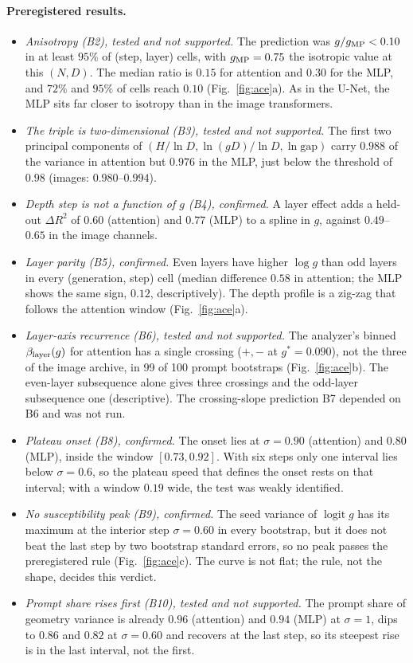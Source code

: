 \documentclass[11pt]{article}
\newcommand{\gap}{\mathrm{gap}}
\begin{document}
\paragraph{Preregistered results.}
\begin{itemize}
 \item \emph{Anisotropy (B2), tested and not supported.} The prediction was $g/g_{\rm MP}<0.10$ in at least $95\%$ of (step, layer) cells, with $g_{\rm MP}=0.75$ the isotropic value at this $(N,D)$. The median ratio is $0.15$ for attention and $0.30$ for the MLP, and $72\%$ and $95\%$ of cells reach $0.10$ (Fig.~\ref{fig:ace}a). As in the U-Net, the MLP sits far closer to isotropy than in the image transformers.
 \item \emph{The triple is two-dimensional (B3), tested and not supported.} The first two principal components of $(H/\ln D, \ln(gD)/\ln D, \ln\gap)$ carry $0.988$ of the variance in attention but $0.976$ in the MLP, just below the threshold of $0.98$ (images: $0.980$--$0.994$).
 \item \emph{Depth step is not a function of $g$ (B4), confirmed.} A layer effect adds a held-out $\Delta R^2$ of $0.60$ (attention) and $0.77$ (MLP) to a spline in $g$, against $0.49$--$0.65$ in the image channels.
 \item \emph{Layer parity (B5), confirmed.} Even layers have higher $\log g$ than odd layers in every (generation, step) cell (median difference $0.58$ in attention; the MLP shows the same sign, $0.12$, descriptively). The depth profile is a zig-zag that follows the attention window (Fig.~\ref{fig:ace}a).
 \item \emph{Layer-axis recurrence (B6), tested and not supported.} The analyzer's binned $\beta_{\rm layer}(g)$ for attention has a single crossing ($+,-$ at $g^{*}=0.090$), not the three of the image archive, in 99 of 100 prompt bootstraps (Fig.~\ref{fig:ace}b). The even-layer subsequence alone gives three crossings and the odd-layer subsequence one (descriptive). The crossing-slope prediction B7 depended on B6 and was not run.
 \item \emph{Plateau onset (B8), confirmed.} The onset lies at $\sigma=0.90$ (attention) and $0.80$ (MLP), inside the window $[0.73,0.92]$. With six steps only one interval lies below $\sigma=0.6$, so the plateau speed that defines the onset rests on that interval; with a window $0.19$ wide, the test was weakly identified.
 \item \emph{No susceptibility peak (B9), confirmed.} The seed variance of $\operatorname{logit} g$ has its maximum at the interior step $\sigma=0.60$ in every bootstrap, but it does not beat the last step by two bootstrap standard errors, so no peak passes the preregistered rule (Fig.~\ref{fig:ace}c). The curve is not flat; the rule, not the shape, decides this verdict.
 \item \emph{Prompt share rises first (B10), tested and not supported.} The prompt share of geometry variance is already $0.96$ (attention) and $0.94$ (MLP) at $\sigma=1$, dips to $0.86$ and $0.82$ at $\sigma=0.60$ and recovers at the last step, so its steepest rise is in the last interval, not the first.
\end{itemize}
\end{document}
